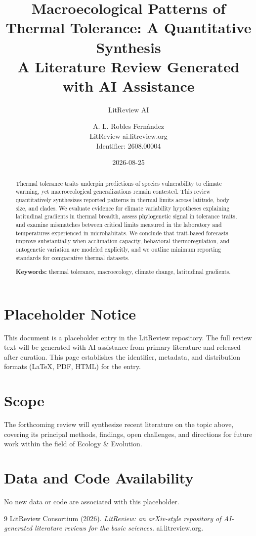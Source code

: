 \documentclass[11pt]{article}
\title{Macroecological Patterns of Thermal Tolerance: A Quantitative Synthesis\\
\large A Literature Review Generated with AI Assistance}
\author{LitReview AI \and A. L. Robles Fernández\\[4pt]
\small LitReview \textbar{} ai.litreview.org\\
\small Identifier: 2608.00004}
\date{2026-08-25}
\begin{document}
\maketitle

\begin{abstract}
Thermal tolerance traits underpin predictions of species vulnerability to climate warming, yet macroecological generalizations remain contested. This review quantitatively synthesizes reported patterns in thermal limits across latitude, body size, and clades. We evaluate evidence for climate variability hypotheses explaining latitudinal gradients in thermal breadth, assess phylogenetic signal in tolerance traits, and examine mismatches between critical limits measured in the laboratory and temperatures experienced in microhabitats. We conclude that trait-based forecasts improve substantially when acclimation capacity, behavioral thermoregulation, and ontogenetic variation are modeled explicitly, and we outline minimum reporting standards for comparative thermal datasets.

\noindent\textbf{Keywords:} thermal tolerance, macroecology, climate change, latitudinal gradients.
\end{abstract}

\section*{Placeholder Notice}
This document is a placeholder entry in the LitReview repository. The full
review text will be generated with AI assistance from primary literature and
released after curation. This page establishes the identifier, metadata, and
distribution formats (LaTeX, PDF, HTML) for the entry.

\section*{Scope}
The forthcoming review will synthesize recent literature on the topic above,
covering its principal methods, findings, open challenges, and directions for
future work within the field of Ecology \& Evolution.

\section*{Data and Code Availability}
No new data or code are associated with this placeholder.


\begin{thebibliography}{9}
 LitReview Consortium (2026). \emph{LitReview: an arXiv-style repository of AI-generated literature reviews for the basic sciences.} ai.litreview.org.
\end{thebibliography}
\end{document}
